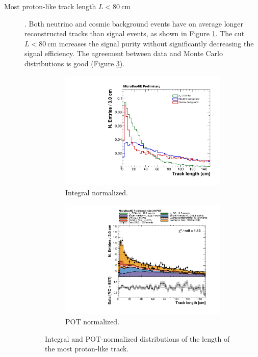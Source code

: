 \begin{description}
\item[Most proton-like track length $L < 80~\mathrm{cm}$]. Both neutrino and cosmic background events have on average longer reconstructed tracks than signal events, as shown in Figure \ref{fig:length_norm}. The cut $L < 80~$cm increases the signal purity without significantly decreasing the signal efficiency. The agreement between data and Monte Carlo distributions is good (Figure \ref{fig:length_pot}).

\begin{figure}[htbp]
\centering
  \begin{subfigure}{0.45\textwidth}
    \includegraphics[width=\linewidth]{figures/h_track_length_norm.pdf}
    \caption{Integral normalized.} \label{fig:length_norm}
  \end{subfigure}
    \begin{subfigure}{0.45\textwidth}
    \includegraphics[width=\linewidth]{figures/h_track_length.pdf}
    \caption{POT normalized.} \label{fig:length_pot}
  \end{subfigure}
  \caption{Integral and POT-normalized distributions of the length of the most proton-like track.}
\end{figure}

\end{description}

